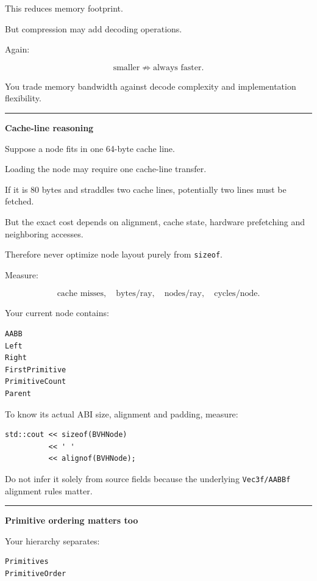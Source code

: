 This reduces memory footprint.

But compression may add decoding operations.

Again:

\[
\text{smaller}
\not\Rightarrow
\text{always faster}.
\]

You trade memory bandwidth against decode complexity and implementation flexibility.

\begin{center}\rule{0.5\linewidth}{0.5pt}\end{center}

\textbf{Cache-line reasoning}

Suppose a node fits in one 64-byte cache line.

Loading the node may require one cache-line transfer.

If it is 80 bytes and straddles two cache lines, potentially two lines must be fetched.

But the exact cost depends on alignment, cache state, hardware prefetching and neighboring accesses.

Therefore never optimize node layout purely from \texttt{sizeof}.

Measure:

\[
\text{cache misses},
\quad
\text{bytes/ray},
\quad
\text{nodes/ray},
\quad
\text{cycles/node}.
\]

Your current node contains:

\begin{verbatim}
AABB
Left
Right
FirstPrimitive
PrimitiveCount
Parent
\end{verbatim}

To know its actual ABI size, alignment and padding, measure:

\begin{verbatim}
std::cout << sizeof(BVHNode)
          << ' '
          << alignof(BVHNode);
\end{verbatim}

Do not infer it solely from source fields because the underlying \texttt{Vec3f/AABBf} alignment rules matter.

\begin{center}\rule{0.5\linewidth}{0.5pt}\end{center}

\textbf{Primitive ordering matters too}

Your hierarchy separates:

\begin{verbatim}
Primitives
PrimitiveOrder
\end{verbatim}

